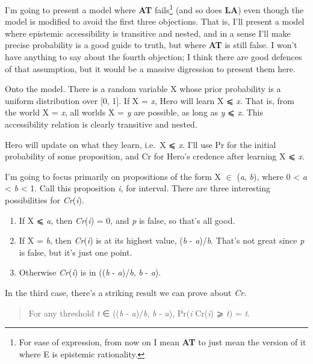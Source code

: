 \documentclass[
  11pt,
  letterpaper,
  DIV=11,
  numbers=noendperiod,
  twoside]{scrartcl}
\providecommand{\tightlist}{%
  \setlength{\itemsep}{0pt}\setlength{\parskip}{0pt}}
\begin{document}
I'm going to present a model where \textbf{AT} fails\footnote{For ease
  of expression, from now on I mean \textbf{AT} to just mean the version
  of it where E is epistemic rationality.} (and so does \textbf{LA})
even though the model is modified to avoid the first three objections.
That is, I'll present a model where epistemic accessibility is
transitive and nested, and in a sense I'll make precise probability is a
good guide to truth, but where \textbf{AT} is still false. I won't have
anything to say about the fourth objection; I think there are good
defences of that assumption, but it would be a massive digression to
present them here.

Onto the model. There is a random variable X whose prior probability is
a uniform distribution over {[}0, 1{]}. If X = \emph{x}, Hero will learn
X ⩽ \emph{x}. That is, from the world X = \emph{x}, all worlds X =
\emph{y} are possible, as long as \emph{y} ⩽ \emph{x}. This
accessibility relation is clearly transitive and nested.

Hero will update on what they learn, i.e.~X ⩽ \emph{x}. I'll use Pr for
the initial probability of some proposition, and Cr for Hero's credence
after learning X ⩽ \emph{x}.

I'm going to focus primarily on propositions of the form X \(\in\)
(\emph{a}, \emph{b}), where 0 \textless{} \emph{a} \textless{} \emph{b}
\textless{} 1. Call this proposition \emph{i}, for interval. There are
three interesting possibilities for \emph{Cr}(\emph{i}).

\begin{enumerate}
\def\labelenumi{\arabic{enumi}.}
\tightlist
\item
  If X ⩽ \emph{a}, then \emph{Cr}(\emph{i}) = 0, and \emph{p} is false,
  so that's all good.
\item
  If X = \emph{b}, then \emph{Cr}(\emph{i}) is at its highest value,
  (\emph{b} - \emph{a})/\emph{b}. That's not great since \emph{p} is
  false, but it's just one point.
\item
  Otherwise \emph{Cr}(\emph{i}) is in ((\emph{b} - \emph{a})/\emph{b},
  \emph{b} - \emph{a}).
\end{enumerate}

In the third case, there's a striking result we can prove about
\emph{Cr}.

\begin{quote}
For any threshold \emph{t} ∈ ((\emph{b} - \emph{a})/\emph{b}, \emph{b} -
\emph{a}), Pr(\emph{i} \textbar{} Cr(\emph{i}) ⩾ \emph{t}) = \emph{t}.
\end{quote}
\end{document}

